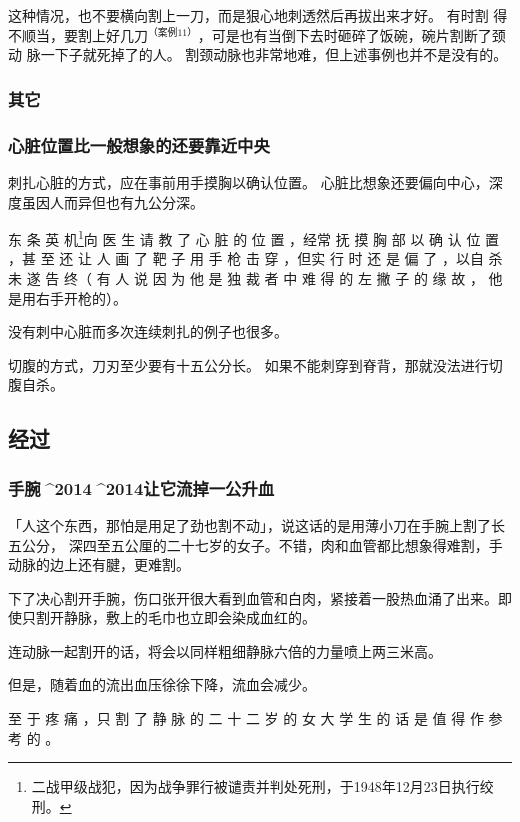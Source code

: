 \documentclass[UTF8]{ctexart}
\begin{document}
这种情况，也不要横向割上一刀，而是狠心地刺透然后再拔出来才好。
有时割 得不顺当，要割上好几刀$^{（案例11）}$，可是也有当倒下去时砸碎了饭碗，碗片割断了颈动 脉一下子就死掉了的人。
割颈动脉也非常地难，但上述事例也并不是没有的。

\subsubsection{其它}

\subsubsection*{心脏位置比一般想象的还要靠近中央}

刺扎心脏的方式，应在事前用手摸胸以确认位置。
心脏比想象还要偏向中心，深度虽因人而异但也有九公分深。

东 条 英 机\footnote{二战甲级战犯，因为战争罪行被谴责并判处死刑，于1948年12月23日执行绞刑。}向 医 生 请 教 了 心 脏 的 位 置 ，经常 抚 摸 胸 部 以 确 认 位 置 ，甚 至 还 让 人 画 了 靶 子 用 手 枪 击 穿 ，但实 行 时 还 是 偏 了 ，以自 杀 未 遂 告 终（ 有 人 说 因 为 他 是 独 裁 者 中 难 得 的 左 撇 子 的 缘 故 ， 他是用右手开枪的）。

没有刺中心脏而多次连续刺扎的例子也很多。

切腹的方式，刀刃至少要有十五公分长。
如果不能刺穿到脊背，那就没法进行切腹自杀。

\subsection{经过}

\subsubsection{手腕^^^^2014^^^^2014让它流掉一公升血}

「人这个东西，那怕是用足了劲也割不动」，说这话的是用薄小刀在手腕上割了长五公分，
深四至五公厘的二十七岁的女子。不错，肉和血管都比想象得难割，手动脉的边上还有腱，更难割。

下了决心割开手腕，伤口张开很大看到血管和白肉，紧接着一股热血涌了出来。即使只割开静脉，敷上的毛巾也立即会染成血红的。

连动脉一起割开的话，将会以同样粗细静脉六倍的力量喷上两三米高。

但是，随着血的流出血压徐徐下降，流血会减少。 

至 于 疼 痛 ，只 割 了 静 脉 的 二 十 二 岁 的 女 大 学 生 的 话 是 值 得 作 参 考 的 。
\end{document}
